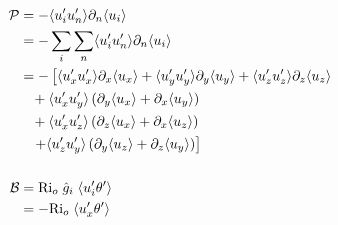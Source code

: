 \begin{equation*}
\begin{aligned}
\mathcal{P} &= - \langle u'_i u'_n \rangle \partial_n \langle u_i \rangle \\
			&= - \sum_i  \sum_n  \langle u'_i u'_n \rangle \partial_n \langle u_i \rangle \\
			&= - \left[ \langle u'_x u'_x \rangle \partial_x \langle u_x \rangle + \langle u'_y u'_y \rangle \partial_y \langle u_y \rangle + \langle u'_z u'_z \rangle \partial_z \langle u_z \rangle \right. \\
			& \hspace{3mm} +  \langle u'_x u'_y \rangle  \left(  \partial_y \langle u_x \rangle + \partial_x \langle u_y \rangle \right) \\
			& \hspace{3mm} +  \langle u'_x u'_z \rangle \left(  \partial_z \langle u_x \rangle + \partial_x \langle u_z \rangle \right) \\ 
			& \left. \hspace{3mm} +  \langle u'_z u'_y \rangle  \left(  \partial_y \langle u_z \rangle + \partial_z \langle u_y \rangle \right)	\right] 
\\
			\\
\mathcal{B} &= \text{Ri}_o \hspace{1mm} \hat{g}_i \hspace{1mm} \langle u'_i \theta' \rangle \\
			&= - \text{Ri}_o \hspace{1mm} \langle u'_x \theta' \rangle
\end{aligned}
\end{equation*}

